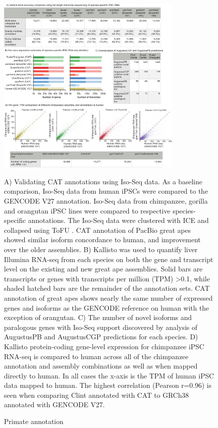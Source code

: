 \documentclass[fleqn,10pt]{wlscirep}
\begin{document}
\begin{figure}
\centering
\includegraphics[width=0.8\textwidth,height=0.8\textheight,keepaspectratio]{figure2-primate_v10.pdf}
\caption{Primate annotation}
A) Validating CAT annotations using Iso-Seq data. As a baseline comparison, Iso-Seq data from human iPSCs were compared to the GENCODE V27 annotation. Iso-Seq data from chimpanzee, gorilla and orangutan iPSC lines were compared to respective species-specific annotations. The Iso-Seq data were clustered with ICE and collapsed using ToFU \citep{gordon2015widespread}. CAT annotation of PacBio great apes showed similar isoform concordance to human, and improvement over the older assemblies. B) Kallisto \citep{bray2015near} was used to quantify liver Illumina RNA-seq from each species on both the gene and transcript level on the existing and new great ape assemblies. Solid bars are transcripts or genes with transcripts per million (TPM) \textgreater 0.1, while shaded hatched bars are the remainder of the annotation sets. CAT annotation of great apes shows nearly the same number of expressed genes and isoforms as the GENCODE reference on human with the exception of orangutan. C) The number of novel isoforms and paralogous genes with Iso-Seq support discovered by analysis of AugustusPB and AugustusCGP predictions for each species. D) Kallisto protein-coding gene-level expression for chimpanzee iPSC RNA-seq is compared to human across all of the chimpanzee annotation and assembly combinations as well as when mapped directly to human. In all cases the x-axis is the TPM of human iPSC data mapped to human. The highest correlation (Pearson r=0.96) is seen when comparing Clint annotated with CAT to GRCh38 annotated with GENCODE V27.
\label{fig:primate}
\end{figure}
\end{document}
